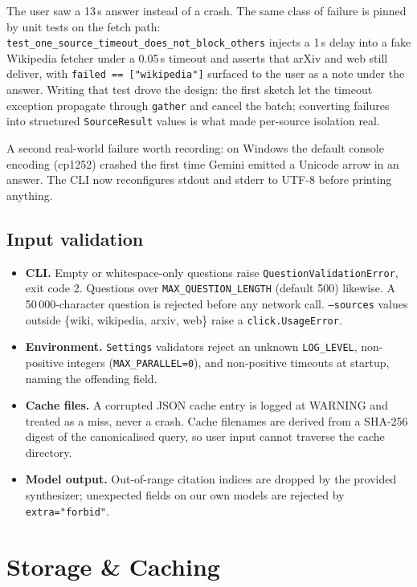 \documentclass[11pt,a4paper]{article}
\begin{document}
The user saw a 13\,s answer instead of a crash. The same class of failure is pinned by unit tests on the fetch path: \texttt{test\_one\_source\_timeout\_does\_not\_block\_others} injects a 1\,s delay into a fake Wikipedia fetcher under a 0.05\,s timeout and asserts that arXiv and web still deliver, with \texttt{failed == ["wikipedia"]} surfaced to the user as a note under the answer. Writing that test drove the design: the first sketch let the timeout exception propagate through \texttt{gather} and cancel the batch; converting failures into structured \texttt{SourceResult} values is what made per-source isolation real.

A second real-world failure worth recording: on Windows the default console encoding (cp1252) crashed the first time Gemini emitted a Unicode arrow in an answer. The CLI now reconfigures stdout and stderr to UTF-8 before printing anything.

\subsection{Input validation}

\begin{itemize}[topsep=2pt,itemsep=1pt]
  \item \textbf{CLI.} Empty or whitespace-only questions raise \texttt{QuestionValidationError}, exit code 2. Questions over \texttt{MAX\_QUESTION\_LENGTH} (default 500) likewise. A 50\,000-character question is rejected before any network call. \texttt{--sources} values outside \{wiki, wikipedia, arxiv, web\} raise a \texttt{click.UsageError}.
  \item \textbf{Environment.} \texttt{Settings} validators reject an unknown \texttt{LOG\_LEVEL}, non-positive integers (\texttt{MAX\_PARALLEL=0}), and non-positive timeouts at startup, naming the offending field.
  \item \textbf{Cache files.} A corrupted JSON cache entry is logged at WARNING and treated as a miss, never a crash. Cache filenames are derived from a SHA-256 digest of the canonicalised query, so user input cannot traverse the cache directory.
  \item \textbf{Model output.} Out-of-range citation indices are dropped by the provided synthesizer; unexpected fields on our own models are rejected by \texttt{extra="forbid"}.
\end{itemize}

\section{Storage \& Caching}\label{sec:storage}
\end{document}
